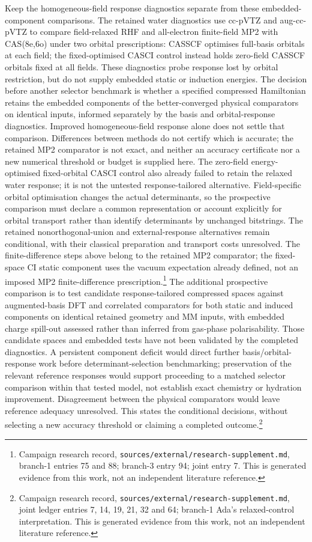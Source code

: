 \documentclass{article}
\newcommand{\record}[1]{\footnote{Campaign research record, \texttt{sources/external/research-supplement.md}, #1. This is generated evidence from this work, not an independent literature reference.}}
\begin{document}
Keep the homogeneous-field response diagnostics separate from these embedded-component comparisons. The retained water diagnostics use cc-pVTZ and aug-cc-pVTZ to compare field-relaxed RHF and all-electron finite-field MP2 with CAS(8e,6o) under two orbital prescriptions: CASSCF optimises full-basis orbitals at each field; the fixed-optimised CASCI control instead holds zero-field CASSCF orbitals fixed at all fields. These diagnostics probe response lost by orbital restriction, but do not supply embedded static or induction energies. The decision before another selector benchmark is whether a specified compressed Hamiltonian retains the embedded components of the better-converged physical comparators on identical inputs, informed separately by the basis and orbital-response diagnostics. Improved homogeneous-field response alone does not settle that comparison. Differences between methods do not certify which is accurate; the retained MP2 comparator is not exact, and neither an accuracy certificate nor a new numerical threshold or budget is supplied here. The zero-field energy-optimised fixed-orbital CASCI control also already failed to retain the relaxed water response; it is not the untested response-tailored alternative. Field-specific orbital optimisation changes the actual determinants, so the prospective comparison must declare a common representation or account explicitly for orbital transport rather than identify determinants by unchanged bitstrings. The retained nonorthogonal-union and external-response alternatives remain conditional, with their classical preparation and transport costs unresolved. The finite-difference steps above belong to the retained MP2 comparator; the fixed-space CI static component uses the vacuum expectation already defined, not an imposed MP2 finite-difference prescription.\record{branch-1 entries 75 and 88; branch-3 entry 94; joint entry 7} The additional prospective comparison is to test candidate response-tailored compressed spaces against augmented-basis DFT and correlated comparators for both static and induced components on identical retained geometry and MM inputs, with embedded charge spill-out assessed rather than inferred from gas-phase polarisability. Those candidate spaces and embedded tests have not been validated by the completed diagnostics. A persistent component deficit would direct further basis/orbital-response work before determinant-selection benchmarking; preservation of the relevant reference responses would support proceeding to a matched selector comparison within that tested model, not establish exact chemistry or hydration improvement. Disagreement between the physical comparators would leave reference adequacy unresolved. This states the conditional decisions, without selecting a new accuracy threshold or claiming a completed outcome.\record{joint ledger entries 7, 14, 19, 21, 32 and 64; branch-1 Ada's relaxed-control interpretation}
\end{document}
